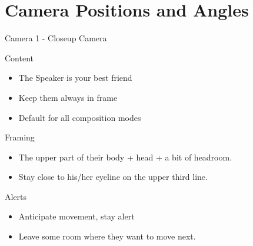 \documentclass[aspectratio=169]{beamer}
\begin{document}
\section{Camera Positions and Angles}




\begin{frame}{Camera 1 - Closeup Camera}
		\begin{block}{Content}
			\begin{itemize}
				\item The Speaker is your best friend
				\item Keep them always in frame
				\item Default for all composition modes
			\end{itemize}
		\end{block}
		
		\begin{block}{Framing}
			\begin{itemize}
				\item The upper part of their body + head + a bit of headroom.
				\item Stay close to his/her eyeline on the upper third line.
			\end{itemize}
		\end{block}

		\begin{alertblock}{Alerts}
			\begin{itemize}
				\item Anticipate movement, stay alert
				\item Leave some room where they want to move next.
			\end{itemize}
		\end{alertblock}
\end{frame}
\end{document}
